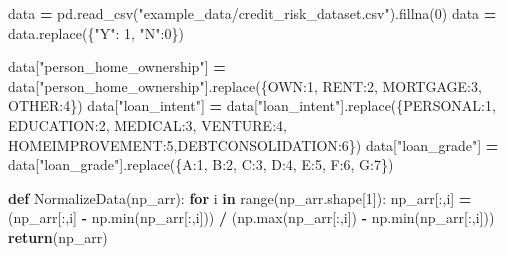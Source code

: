 \documentclass[
]{book}
\newenvironment{Shaded}{\begin{snugshade}}{\end{snugshade}}
\newcommand{\BuiltInTok}[1]{#1}
\newcommand{\ControlFlowTok}[1]{\textcolor[rgb]{0.13,0.29,0.53}{\textbf{#1}}}
\newcommand{\DecValTok}[1]{\textcolor[rgb]{0.00,0.00,0.81}{#1}}
\newcommand{\KeywordTok}[1]{\textcolor[rgb]{0.13,0.29,0.53}{\textbf{#1}}}
\newcommand{\NormalTok}[1]{#1}
\newcommand{\OperatorTok}[1]{\textcolor[rgb]{0.81,0.36,0.00}{\textbf{#1}}}
\newcommand{\StringTok}[1]{\textcolor[rgb]{0.31,0.60,0.02}{#1}}
\begin{document}
\begin{Shaded}
\begin{Highlighting}[]
\NormalTok{data }\OperatorTok{=}\NormalTok{ pd.read\_csv(}\StringTok{"example\_data/credit\_risk\_dataset.csv"}\NormalTok{).fillna(}\DecValTok{0}\NormalTok{)}
\NormalTok{data }\OperatorTok{=}\NormalTok{ data.replace(\{}\StringTok{"Y"}\NormalTok{: }\DecValTok{1}\NormalTok{, }\StringTok{"N"}\NormalTok{:}\DecValTok{0}\NormalTok{\})}

\NormalTok{data[}\StringTok{"person\_home\_ownership"}\NormalTok{] }\OperatorTok{=}\NormalTok{ data[}\StringTok{"person\_home\_ownership"}\NormalTok{].replace(\{}\StringTok{\textquotesingle{}OWN\textquotesingle{}}\NormalTok{:}\DecValTok{1}\NormalTok{, }\StringTok{\textquotesingle{}RENT\textquotesingle{}}\NormalTok{:}\DecValTok{2}\NormalTok{, }\StringTok{\textquotesingle{}MORTGAGE\textquotesingle{}}\NormalTok{:}\DecValTok{3}\NormalTok{, }\StringTok{\textquotesingle{}OTHER\textquotesingle{}}\NormalTok{:}\DecValTok{4}\NormalTok{\})}
\NormalTok{data[}\StringTok{"loan\_intent"}\NormalTok{] }\OperatorTok{=}\NormalTok{ data[}\StringTok{"loan\_intent"}\NormalTok{].replace(\{}\StringTok{\textquotesingle{}PERSONAL\textquotesingle{}}\NormalTok{:}\DecValTok{1}\NormalTok{, }\StringTok{\textquotesingle{}EDUCATION\textquotesingle{}}\NormalTok{:}\DecValTok{2}\NormalTok{, }\StringTok{\textquotesingle{}MEDICAL\textquotesingle{}}\NormalTok{:}\DecValTok{3}\NormalTok{, }\StringTok{\textquotesingle{}VENTURE\textquotesingle{}}\NormalTok{:}\DecValTok{4}\NormalTok{, }\StringTok{\textquotesingle{}HOMEIMPROVEMENT\textquotesingle{}}\NormalTok{:}\DecValTok{5}\NormalTok{,}\StringTok{\textquotesingle{}DEBTCONSOLIDATION\textquotesingle{}}\NormalTok{:}\DecValTok{6}\NormalTok{\})}
\NormalTok{data[}\StringTok{"loan\_grade"}\NormalTok{] }\OperatorTok{=}\NormalTok{ data[}\StringTok{"loan\_grade"}\NormalTok{].replace(\{}\StringTok{\textquotesingle{}A\textquotesingle{}}\NormalTok{:}\DecValTok{1}\NormalTok{, }\StringTok{\textquotesingle{}B\textquotesingle{}}\NormalTok{:}\DecValTok{2}\NormalTok{, }\StringTok{\textquotesingle{}C\textquotesingle{}}\NormalTok{:}\DecValTok{3}\NormalTok{, }\StringTok{\textquotesingle{}D\textquotesingle{}}\NormalTok{:}\DecValTok{4}\NormalTok{, }\StringTok{\textquotesingle{}E\textquotesingle{}}\NormalTok{:}\DecValTok{5}\NormalTok{, }\StringTok{\textquotesingle{}F\textquotesingle{}}\NormalTok{:}\DecValTok{6}\NormalTok{, }\StringTok{\textquotesingle{}G\textquotesingle{}}\NormalTok{:}\DecValTok{7}\NormalTok{\})}

\KeywordTok{def}\NormalTok{ NormalizeData(np\_arr):}
  \ControlFlowTok{for}\NormalTok{ i }\KeywordTok{in} \BuiltInTok{range}\NormalTok{(np\_arr.shape[}\DecValTok{1}\NormalTok{]):}
\NormalTok{    np\_arr[:,i] }\OperatorTok{=}\NormalTok{ (np\_arr[:,i] }\OperatorTok{{-}}\NormalTok{ np.}\BuiltInTok{min}\NormalTok{(np\_arr[:,i])) }\OperatorTok{/}\NormalTok{ (np.}\BuiltInTok{max}\NormalTok{(np\_arr[:,i]) }\OperatorTok{{-}}\NormalTok{ np.}\BuiltInTok{min}\NormalTok{(np\_arr[:,i]))}
  \ControlFlowTok{return}\NormalTok{(np\_arr)}


\end{Highlighting}
\end{Shaded}
\end{document}
